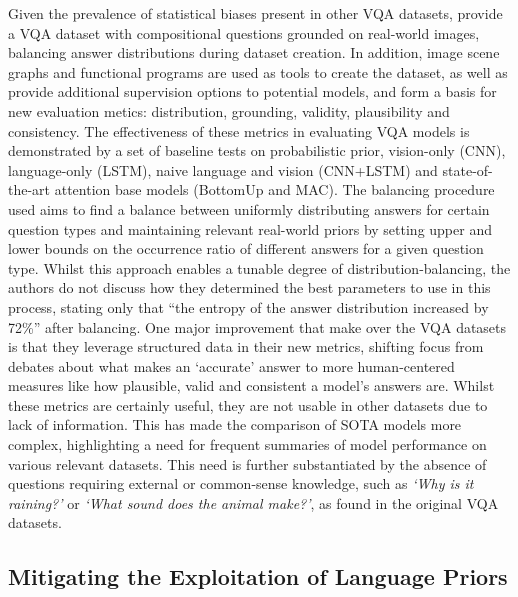 Given the prevalence of statistical biases present in other VQA datasets, \citeauthor{hudson2019gqa} provide a VQA dataset with compositional questions grounded on real-world images, balancing answer distributions during dataset creation. In addition, image scene graphs and functional programs are used as tools to create the dataset, as well as provide additional supervision options to potential models, and form a basis for new evaluation metics: distribution, grounding, validity, plausibility and consistency. The effectiveness of these metrics in evaluating VQA models is demonstrated by a set of baseline tests on probabilistic prior, vision-only (CNN), language-only (LSTM), naive language and vision (CNN+LSTM) and state-of-the-art attention base models (BottomUp and MAC). The balancing procedure used aims to find a balance between uniformly distributing answers for certain question types and maintaining relevant real-world priors by setting upper and lower bounds on the occurrence ratio of different answers for a given question type. Whilst this approach enables a tunable degree of distribution-balancing, the authors do not discuss how they determined the best parameters to use in this process, stating only that ``the entropy of the answer distribution increased by 72\%'' after balancing. One major improvement that \citeauthor{hudson2019gqa} make over the VQA datasets is that they leverage structured data in their new metrics, shifting focus from debates about what makes an `accurate' answer to more human-centered measures like how plausible, valid and consistent a model's answers are. Whilst these metrics are certainly useful, they are not usable in other datasets due to lack of information. This has made the comparison of SOTA models more complex, highlighting a need for frequent summaries of model performance on various relevant datasets. This need is further substantiated by the absence of questions requiring external or common-sense knowledge, such as \textit{`Why is it raining?'} or \textit{`What sound does the animal make?'}, as found in the original VQA datasets.



\subsection{Mitigating the Exploitation of Language Priors} 

